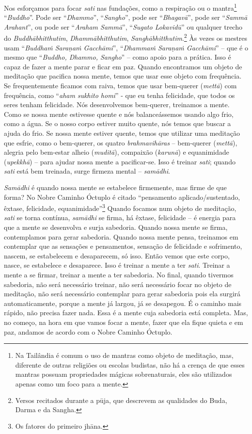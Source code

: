 Nos esforçamos para focar \textit{sati} nas fundações, como a
respiração ou o mantra\footnote{Na Tailândia é comum o uso de mantras
como objeto de meditação, mas, diferente de outras religiões ou escolas
budistas, não há a crença de que esses mantras possuam propriedades
mágicas sobrenaturais, eles são utilizados apenas como um foco para a
mente.} “\textit{Buddho}”. Pode ser “\textit{Dhammo}”,
“\textit{Sangho}”, pode ser “\textit{Bhagavā}”, pode ser
“\textit{Sammā Arahant}”, ou pode ser “\textit{Araham Sammā}”,
“\textit{Sugato Lokavidū}” ou qualquer trecho do
\textit{Buddhābhitthutim}, \textit{Dhammābhitthutim},
\textit{Sanghābhitthutim}.\footnote{Versos recitados durante a pūja,
que descrevem as qualidades do Buda, Darma e da Sangha.} Às vezes os
mestres usam “\textit{Buddhaṁ Saraṇaṁ Gacchāmi}”, “\textit{Dhammaṁ
Saraṇaṁ Gacchāmi}” – que é o mesmo que “\textit{Buddho, Dhammo,
Sangho}” – como apoio para a prática. Isso é capaz de fazer a mente
parar e ficar em paz. Quando encontramos um objeto de meditação que
pacifica nossa mente, temos que usar esse objeto com frequência. Se
frequentemente ficamos com raiva, temos que usar bem-querer
(\textit{mettā}) com frequência, como “\textit{aham sukhito homi}” -
que eu tenha felicidade, que todos os seres tenham felicidade. Nós
desenvolvemos bem-querer, treinamos a mente. Como se nossa mente
estivesse quente e nós balanceássemos usando algo frio, como a água. Se
o nosso corpo estiver muito quente, nós temos que buscar a ajuda do
frio. Se nossa mente estiver quente, temos que utilizar uma meditação
que esfrie, como o bem-querer, os quatro \textit{brahmavihāras} –
bem-querer (\textit{mettā}), alegria pelo bem-estar alheio
(\textit{muditā}), compaixão (\textit{karunā}) e equanimidade
(\textit{upekkhā}) – para ajudar nossa mente a pacificar-se.
Isso é treinar \textit{sati}; quando \textit{sati} está bem treinada,
surge firmeza mental – \textit{samādhi}. 

\textit{Samādhi} é quando nossa mente se estabelece firmemente,
mas firme de que forma? No Nobre Caminho Óctuplo é citado “pensamento
aplicado/sustentado, êxtase, felicidade, equanimidade”\footnote{Os
fatores do primeiro jhāna.} Quando focamos num objeto de meditação,
\textit{sati} se torna contínua, \textit{samādhi} se firma, há
êxtase, felicidade – é energia para que a mente se desenvolva e surja
sabedoria. Quando nossa mente se firma, contemplamos para gerar
sabedoria. Quando nossa mente pensa, treinamos em contemplar que as
sensações e pensamentos, sensação de felicidade e sofrimento, nascem,
se estabelecem e desaparecem, só isso. Então vemos que este corpo,
nasce, se estabelece e desaparece. Isso é treinar a mente a ter
\textit{sati}. Treinar a mente a se firmar, treinar a mente a ter
sabedoria. No final, quando tivermos sabedoria, não será necessário
treinar, não será necessário focar no objeto de meditação, não será
necessário contemplar para gerar sabedoria pois ela surgirá
automaticamente, porque a mente já largou, já se desapegou. É o caminho
mais rápido, não precisa fazer nada. Essa é a mente cuja sabedoria está
completa. Mas, no começo, na hora em que vamos focar a mente, fazer que
ela fique quieta e em paz, andamos de acordo com o Nobre Caminho
Óctuplo. 

